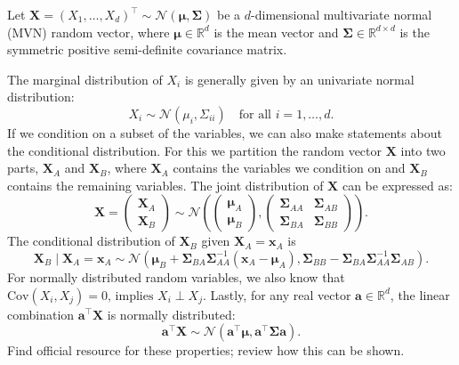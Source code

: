 Let $\boldsymbol{X} = (X_1, \dots, X_d)^\top \sim \mathcal{N}(\boldsymbol{\mu}, \boldsymbol{\Sigma})$ be a $d$-dimensional multivariate normal (MVN) random vector, where $\boldsymbol{\mu} \in \mathbb{R}^d$ is the mean vector and $\boldsymbol{\Sigma} \in \mathbb{R}^{d \times d}$ is the symmetric positive semi-definite covariance matrix.\par

The marginal distribution of $X_i$ is generally given by an univariate normal distribution:
\[
 X_i \sim \mathcal{N}(\mu_i, \Sigma_{ii}) \quad \text{for all } i = 1, \dots, d.
\]
If we condition on a subset of the variables, we can also make statements about the conditional distribution. For this we partition the random vector $\boldsymbol{X}$ into two parts, $\boldsymbol{X}_A$ and $\boldsymbol{X}_B$, where $\boldsymbol{X}_A$ contains the variables we condition on and $\boldsymbol{X}_B$ contains the remaining variables. The joint distribution of $\boldsymbol{X}$ can be expressed as:
    \[
    \boldsymbol{X} = 
    \begin{pmatrix}
    \boldsymbol{X}_A \\
    \boldsymbol{X}_B
    \end{pmatrix}
    \sim \mathcal{N}\left(
    \begin{pmatrix}
    \boldsymbol{\mu}_A \\
    \boldsymbol{\mu}_B
    \end{pmatrix},
    \begin{pmatrix}
    \boldsymbol{\Sigma}_{AA} & \boldsymbol{\Sigma}_{AB} \\
    \boldsymbol{\Sigma}_{BA} & \boldsymbol{\Sigma}_{BB}
    \end{pmatrix}
    \right).
    \]
The conditional distribution of $\boldsymbol{X}_B$ given $\boldsymbol{X}_A = \boldsymbol{x}_A$ is
    \[
    \boldsymbol{X}_B \mid \boldsymbol{X}_A = \boldsymbol{x}_A \sim 
    \mathcal{N} \left(
    \boldsymbol{\mu}_B + \boldsymbol{\Sigma}_{BA} \boldsymbol{\Sigma}_{AA}^{-1} (\boldsymbol{x}_A - \boldsymbol{\mu}_A),
    \boldsymbol{\Sigma}_{BB} - \boldsymbol{\Sigma}_{BA} \boldsymbol{\Sigma}_{AA}^{-1} \boldsymbol{\Sigma}_{AB}
    \right).
    \]
For normally distributed random variables, we also know that \(\text{Cov}(X_i, X_j) = 0 \text{, implies } X_i \perp X_j\).
Lastly, for any real vector $\boldsymbol{a} \in \mathbb{R}^d$, the linear combination $\boldsymbol{a}^\top \boldsymbol{X}$ is normally distributed:
\[
\boldsymbol{a}^\top \boldsymbol{X} \sim \mathcal{N}(\boldsymbol{a}^\top \boldsymbol{\mu}, \boldsymbol{a}^\top \boldsymbol{\Sigma} \boldsymbol{a}).
\]
{\color{blue}Find official resource for these properties; review how this can be shown.}